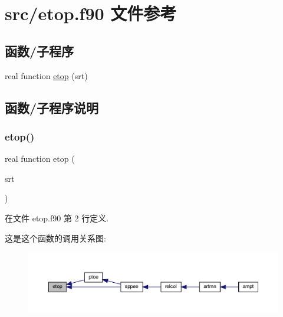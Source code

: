 \hypertarget{etop_8f90}{}\section{src/etop.f90 文件参考}
\label{etop_8f90}
\subsection*{函数/子程序}
\begin{DoxyCompactItemize}
\item 
real function \mbox{\hyperlink{etop_8f90_a5c03478c466c8a4ed44ea58d81c1d326}{etop}} (srt)
\end{DoxyCompactItemize}


\subsection{函数/子程序说明}
\mbox{\label{etop_8f90_a5c03478c466c8a4ed44ea58d81c1d326}} 
\subsubsection{\texorpdfstring{etop()}{etop()}}
{\footnotesize\ttfamily real function etop (\begin{DoxyParamCaption}\item[{}]{srt }\end{DoxyParamCaption})}



在文件 etop.\+f90 第 2 行定义.

这是这个函数的调用关系图\+:
\nopagebreak
\begin{figure}[H]
\begin{center}
\leavevmode
\includegraphics[width=350pt]{etop_8f90_a5c03478c466c8a4ed44ea58d81c1d326_icgraph}
\end{center}
\end{figure}

